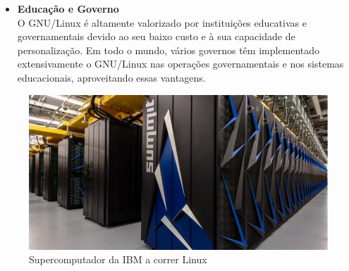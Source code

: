 \begin{itemize}
    \item \textbf{Educação e Governo}\\
    O GNU/Linux é altamente valorizado por instituições educativas e governamentais devido ao seu baixo custo e à sua capacidade de personalização. Em todo o mundo, vários governos têm implementado extensivamente o GNU/Linux nas operações governamentais e nos sistemas educacionais, aproveitando essas vantagens.

\end{itemize}

\par \vspace{6pt}

\begin{figure}[H]
    \centering
    \includegraphics[scale=0.4]{Figures/0. General/super_computer.jpg}
    \caption{Supercomputador da IBM a correr Linux}
    \label{Supercomputador da IBM a correr Linux}
\end{figure}